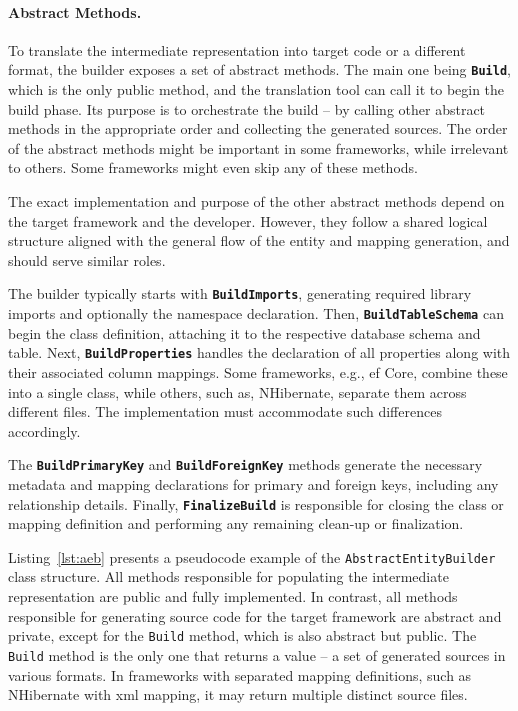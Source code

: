 \paragraph{Abstract Methods.}
To translate the intermediate representation into target code or a different format, the builder exposes a set of abstract methods. The main one being \texttt{\textbf{Build}}, which is the only public method, and the translation tool can call it to begin the build phase. Its purpose is to orchestrate the build -- by calling other abstract methods in the appropriate order and collecting the generated sources. The order of the abstract methods might be important in some frameworks, while irrelevant to others. Some frameworks might even skip any of these methods.

The exact implementation and purpose of the other abstract methods depend on the target framework and the developer. However, they follow a shared logical structure aligned with the general flow of the entity and mapping generation, and should serve similar roles. 

The builder typically starts with \texttt{\textbf{BuildImports}}, generating required library imports and optionally the namespace declaration. Then, \texttt{\textbf{BuildTableSchema}} can begin the class definition, attaching it to the respective database schema and table. 
Next, \texttt{\textbf{BuildProperties}} handles the declaration of all properties along with their associated column mappings. Some frameworks, e.g., \acrshort{ef} Core, combine these into a single class, while others, such as, NHibernate, separate them across different files. The implementation must accommodate such differences accordingly.

The \texttt{\textbf{BuildPrimaryKey}} and \texttt{\textbf{BuildForeignKey}} methods generate the necessary metadata and mapping declarations for primary and foreign keys, including any relationship details.
Finally, \texttt{\textbf{FinalizeBuild}} is responsible for closing the class or mapping definition and performing any remaining clean-up or finalization.

Listing~\ref{lst:aeb} presents a pseudocode example of the \texttt{AbstractEntityBuilder} class structure. All methods responsible for populating the intermediate representation are public and fully implemented. In contrast, all methods responsible for generating source code for the target framework are abstract and private, except for the \texttt{Build} method, which is also abstract but public. The \texttt{Build} method is the only one that returns a value -- a set of generated sources in various formats. In frameworks with separated mapping definitions, such as NHibernate with \acrshort{xml} mapping, it may return multiple distinct source files. 

